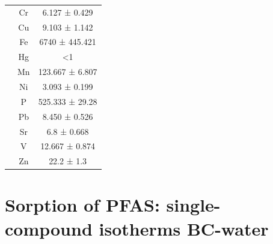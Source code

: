 \begin{table}
\begin{tabular}{c|cc}
                                        & Cr                                     & 6.127 ± 0.429              \\
                                        & Cu                                     & 9.103 ± 1.142              \\
                                        & Fe                                     & 6740 ± 445.421             \\
                                        & Hg                                     & \textless{}1             \\
                                        & Mn                                     & 123.667 ± 6.807            \\
                                        & Ni                                     & 3.093 ± 0.199              \\
                                        & P                                      & 525.333 ± 29.28           \\
                                        & Pb                                     & 8.450 ± 0.526               \\
                                        & Sr                                     & 6.8 ± 0.668                \\
                                        & V                                      & 12.667 ± 0.874             \\
                                        & Zn                                     & 22.2 ± 1.3                \\ \bottomrule
\end{tabular}
\end{table}

\section{Sorption of PFAS: single-compound isotherms BC-water}

